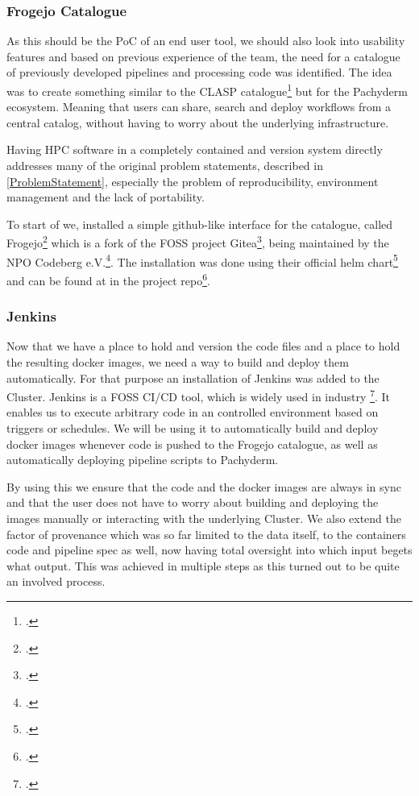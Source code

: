 \subsubsection{Frogejo Catalogue}

As this should be the \ac{PoC} of an end user tool, we should also look into usability features and based on previous experience of the team,
the need for a catalogue of previously developed pipelines and processing code was identified.
The idea was to create something similar to the \ac{CLASP} catalogue\footcite{sayersCLoudApplicationServices2015} but for the Pachyderm ecosystem.
Meaning that users can share, search and deploy workflows from a central catalog, without having to worry about the underlying infrastructure.

Having \ac{HPC} software in a completely contained and version system directly addresses many of the original problem statements,
described in \ref{ProblemStatement}, especially the problem of reproducibility, environment management and the lack of portability.

To start of we, installed a simple github-like interface for the catalogue, called Frogejo\footcite{forgejoForgejo} which is a fork of the \ac{FOSS} project Gitea\footcite{GiteaGitCup2023},
being maintained by the \ac{NPO} Codeberg e.V.\footcite{codebergCodebergOrg}.
The installation was done using their official helm chart\footcite{Forgejo13Forgejo} and can be found at in the project repo\footcite{Forgejo config}.

\subsubsection{Jenkins}

Now that we have a place to hold and version the code files and a place to hold the resulting docker images, we need a way to build and deploy them automatically.
For that purpose an installation of Jenkins was added to the Cluster. Jenkins is a \ac{FOSS} \ac{CI/CD} tool, which is widely used in industry \footcite{JenkinsMarketShare}.
It enables us to execute arbitrary code in an controlled environment based on triggers or schedules.
We will be using it to automatically build and deploy docker images whenever code is pushed to the Frogejo catalogue, as well as automatically deploying pipeline scripts to Pachyderm.

By using this we ensure that the code and the docker images are always in sync and that the user does not have to worry about building and deploying the images manually or interacting with the underlying Cluster.
We also extend the factor of provenance which was so far limited to the data itself, to the containers code and pipeline spec as well, now having total oversight into which input begets what output.
This was achieved in multiple steps as this turned out to be quite an involved process.

